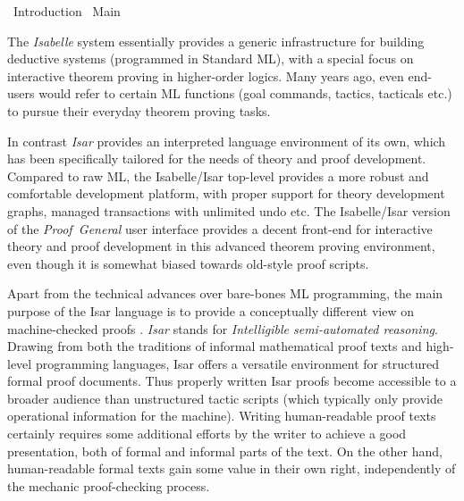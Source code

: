 %
\begin{isabellebody}%
\def\isabellecontext{Introduction}%
%
\isadelimtheory
%
\endisadelimtheory
%
\isatagtheory
{}\isamarkupfalse%
\ Introduction\isanewline
{}\ Main\isanewline
{}%
\endisatagtheory
{\isafoldtheory}%
%
\isadelimtheory
%
\endisadelimtheory
%
\isamarkuptrue%
%
\isamarkuptrue%
%
\begin{isamarkuptext}%
The \emph{Isabelle} system essentially provides a generic
  infrastructure for building deductive systems (programmed in
  Standard ML), with a special focus on interactive theorem proving in
  higher-order logics.  Many years ago, even end-users would refer to
  certain ML functions (goal commands, tactics, tacticals etc.) to
  pursue their everyday theorem proving tasks.
  
  In contrast \emph{Isar} provides an interpreted language environment
  of its own, which has been specifically tailored for the needs of
  theory and proof development.  Compared to raw ML, the Isabelle/Isar
  top-level provides a more robust and comfortable development
  platform, with proper support for theory development graphs, managed
  transactions with unlimited undo etc.  The Isabelle/Isar version of
  the \emph{Proof~General} user interface
  \cite{proofgeneral,Aspinall:TACAS:2000} provides a decent front-end
  for interactive theory and proof development in this advanced
  theorem proving environment, even though it is somewhat biased
  towards old-style proof scripts.

  \medskip Apart from the technical advances over bare-bones ML
  programming, the main purpose of the Isar language is to provide a
  conceptually different view on machine-checked proofs
  \cite{Wenzel:1999:TPHOL,Wenzel-PhD}.  \emph{Isar} stands for
  \emph{Intelligible semi-automated reasoning}.  Drawing from both the
  traditions of informal mathematical proof texts and high-level
  programming languages, Isar offers a versatile environment for
  structured formal proof documents.  Thus properly written Isar
  proofs become accessible to a broader audience than unstructured
  tactic scripts (which typically only provide operational information
  for the machine).  Writing human-readable proof texts certainly
  requires some additional efforts by the writer to achieve a good
  presentation, both of formal and informal parts of the text.  On the
  other hand, human-readable formal texts gain some value in their own
  right, independently of the mechanic proof-checking process.


\end{isamarkuptext}
\end{isabellebody}
